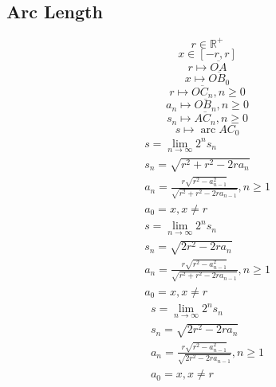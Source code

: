 \documentclass[a4paper,12pt]{report}
\DeclareMathOperator{\arc}{arc}
\begin{document}
\subsection{Arc Length}
\begin{equation}
r \in \mathbb{R}^+
\end{equation}
\begin{equation}
x \in [-r,r]
\end{equation}
\begin{equation}
r \mapsto \overline{OA}
\end{equation}
\begin{equation}
x \mapsto \overline{OB_0}
\end{equation}
\begin{equation}
r \mapsto \overline{OC_n}, n \geq 0
\end{equation}
\begin{equation}
a_n \mapsto \overline{OB_n}, n \geq 0
\end{equation}
\begin{equation}
s_n \mapsto \overline{AC_n}, n \geq 0
\end{equation}
\begin{equation}
s \mapsto \arc AC_0
\end{equation}
\begin{subequations}
\begin{gather}
s = \lim \limits_{n \to \infty} 2^n s_n \\
s_n = \sqrt{r^2 + r^2 - 2ra_n} \\
a_n = \frac{r \sqrt{r^2 - a_{n-1}^2}}{\sqrt{r^2 + r^2 - 2ra_{n-1}}}, n \geq 1 \\
a_0 = x, x \neq r
\end{gather}
\end{subequations}
\begin{subequations}
\begin{gather}
s = \lim \limits_{n \to \infty} 2^n s_n \\
s_n = \sqrt{2r^2 - 2ra_n} \\
a_n = \frac{r \sqrt{r^2 - a_{n-1}^2}}{\sqrt{r^2 + r^2 - 2ra_{n-1}}}, n \geq 1 \\
a_0 = x, x \neq r
\end{gather}
\end{subequations}
\begin{subequations}
\begin{gather}
s = \lim \limits_{n \to \infty} 2^n s_n \\
s_n = \sqrt{2r^2 - 2ra_n} \\
a_n = \frac{r \sqrt{r^2 - a_{n-1}^2}}{\sqrt{2r^2 - 2ra_{n-1}}}, n \geq 1 \\
a_0 = x, x \neq r
\end{gather}
\end{subequations}
\end{document}
